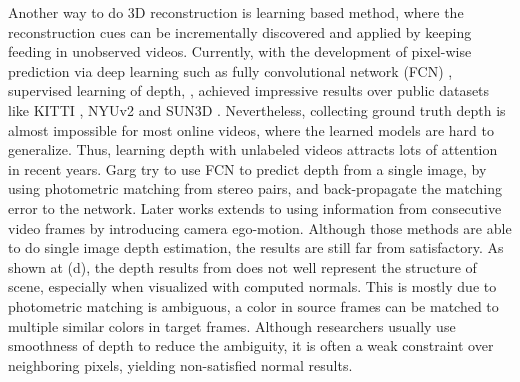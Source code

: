 Another way to do 3D reconstruction is learning based method, where the reconstruction cues can be incrementally discovered and applied by keeping feeding in unobserved videos. Currently, with the development of pixel-wise prediction via deep learning such as fully convolutional network (FCN) \cite{long2015fully}, supervised learning of depth, \eg \cite{eigen2014depth,ummenhofer2016demon}, achieved impressive results over public datasets like KITTI \cite{geiger2012we}, NYUv2 \cite{silberman2012indoor} and SUN3D \cite{xiao2013sun3d}. 
Nevertheless, collecting ground truth depth is almost impossible for most online videos, where the learned models are hard to generalize. 
Thus, learning depth with unlabeled videos attracts lots of attention in recent years.
Garg \etal \cite{godard2016unsupervised} try to use FCN to predict depth from a single image, by using photometric matching from stereo pairs, and back-propagate the matching error to the network. Later works \cite{zhou2017unsupervised,Vijayanarasimhan17} extends to using information from consecutive video frames by introducing camera ego-motion. 
Although those methods are able to do single image depth estimation, the results are still far from satisfactory. As shown at (d), the depth results from \cite{zhou2017unsupervised} does not well represent the structure of scene, especially when visualized with computed normals. 
This is mostly due to photometric matching is ambiguous, \ie a color in source frames can be matched to multiple similar colors in target frames. Although researchers usually use smoothness of depth \cite{zhou2017unsupervised} to reduce the ambiguity, it is often a weak constraint over neighboring pixels, yielding non-satisfied normal results.


